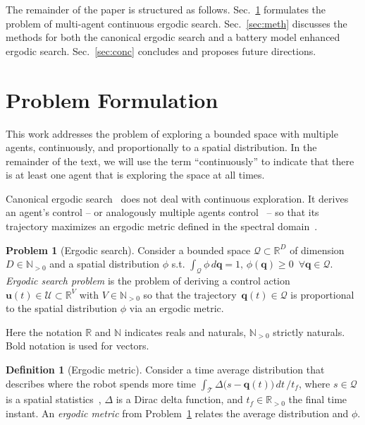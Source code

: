 \documentclass[letterpaper,10pt,conference,twoside]{IEEEtran}
\theoremstyle{definition}
\newtheorem{defn}{Definition}[section]
\newtheorem{pb}{Problem}[section]
\begin{document}
The remainder of the paper is structured as follows. Sec.~\ref{sec:pb} formulates the problem of multi-agent continuous ergodic search. Sec.~\ref{sec:meth} discusses the methods for both the canonical ergodic search and a battery model enhanced ergodic search. Sec.~\ref{sec:conc} concludes and proposes future directions.


\section{Problem Formulation}\label{sec:pb}
\noindent
This work addresses the problem of exploring a bounded space with multiple agents, continuously, and proportionally to a spatial distribution. 
%
In the remainder of the text, we will use the term ``continuously'' to indicate that there is at least one agent that is exploring the space at all times.

Canonical ergodic search~\cite{mathew2011metrics,miller2013trajectory,abraham2021ergodic,miller2016ergodic,dressel2018optimality,torre2016ergodic,shetty2022ergodic} does not deal with continuous exploration. It derives an agent's control -- or analogously multiple agents control~\cite{prabhakar2020ergodic,coffin2022multi,lerch2023safety,abraham2018decentralized,patel2021multi} -- so that its trajectory maximizes an ergodic metric defined in the spectral domain~\cite{calinon2020mixture}.

\begin{pb}[Ergodic search]\label{pb:ergo}
  Consider a bounded space $\mathcal{Q}\subset\mathbb{R}^D$ of dimension $D\in\mathbb{N}_{>0}$ and a spatial distribution $\phi$ s.t. $\int_{\mathcal{Q}}\phi\,d\mathbf{q}=1,\,\phi(\mathbf{q})\geq 0\,\,\, \forall \mathbf{q}\in\mathcal{Q}$.
  \textit{Ergodic search problem} is the problem of deriving a control action $\mathbf{u}(t)\in\mathcal{U}\subset\mathbb{R}^V$ with $V\in\mathbb{N}_{>0}$ so that the trajectory~$\mathbf{q}(t)\in\mathcal{Q}$ is proportional to the spatial distribution $\phi$ via an ergodic metric.
\end{pb}

Here the notation $\mathbb{R}$ and $\mathbb{N}$ indicates reals and naturals, $\mathbb{N}_{>0}$ strictly naturals. Bold notation is used for vectors.

\begin{defn}[Ergodic metric]\label{def:ergom}
  Consider a time average distribution that describes where the robot spends more time $\int_{\mathcal{T}}{\Delta\big(s-\mathbf{q}(t)\big)}\,dt\,/t_f$, 
  where $s\in\mathcal{Q}$ is a spatial statistics~\cite{abraham2018decentralized}, $\Delta$ is a Dirac delta function, and $t_f\in\mathbb{R}_{>0}$ the final time instant. 
  An \textit{ergodic metric} from Problem~\ref{pb:ergo} relates the average distribution and $\phi$.
\end{defn}
\end{document}
